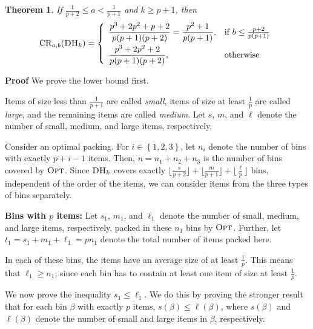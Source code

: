 \documentclass[11pt]{article}
\newtheorem{xtheorem}{Theorem}
\newenvironment{theorem}{\begin{xtheorem}\rm}{\end{xtheorem}}
\newenvironment{proof}{\begin{trivlist}\item[]{\bf Proof }}{\hspace*{\fill}\raisebox{-1pt}{\boldmath$\Box$}\end{trivlist}}
\newcommand{\OPT}{\ensuremath{\operatorname{\textsc{Opt}}}\xspace}
\newcommand{\DHk}{{\ensuremath{\textsc{DH}_k}}\xspace}
\newcommand{\SET}[1]{\left\{#1\right\}}
\newcommand{\CRab}[1]{\ensuremath{\mathrm{CR}_{a,b}(#1)}\xspace}
\newcommand{\p}{p}
\newcommand{\bin}{\ensuremath{\beta}}
\begin{document}
\begin{theorem}\label{lemma-Har-3int}
If $\frac{1}{\p+2}\leq a < \frac{1}{\p+1}$ and $k \geq \p+1$, then
\[
\CRab{\DHk} = 
\left\{
\begin{array}{ll}
\displaystyle 
\frac{\p^3+2\p^2+\p+2}{\p(\p+1)(\p+2)} = \frac{\p^2+1}{\p(\p+1)}, &
               \displaystyle \mbox{if $b \leq \frac{\p+2}{\p(\p+1)}$} \\[2ex]
\displaystyle 
\frac{\p^3+2\p^2+2}{\p(\p+1)(\p+2)},    &
               \displaystyle \mbox{otherwise}
\end{array}
\right.
\]
\end{theorem}
\begin{proof}
 We prove the lower bound first.

Items of size less than $\frac{1}{\p+1}$ are called {\em
  small}, items of size 
at least $\frac{1}{\p}$ are called {\em large}, and the remaining items
are called {\em medium}.
Let $s$, $m$, and $\ell$ denote the number of small, medium, and large
 items, respectively.

Consider an optimal packing.
For $i\in\SET{1,2,3}$,
let $n_i$ denote the number of bins with exactly $\p+i-1$ items.
Then,
$n = n_1 + n_2 + n_3$ is the number of bins covered by \OPT.
Since \DHk covers exactly $\lfloor \frac{s}{\p+2} \rfloor + \lfloor
\frac{m}{\p+1} \rfloor + \lfloor \frac{\ell}{\p} \rfloor$ bins,
independent of the order of the items,  we can
consider items from the three types of bins separately.

{\bf Bins with $\p$ items:}
Let $s_1$, $m_1$, and $\ell_1$ denote the number of small, medium, and
 large items, respectively, packed in these $n_1$ bins by \OPT.
Further, let $t_1 = s_1 + m_1 + \ell_1 = \p n_1$ denote the total
 number of items packed here.

In each of these bins, the items have an average size of at least
$\frac{1}{\p}$. This means that $\ell_1 \geq n_1$, since each bin has to contain at least one item of size at least $\frac{1}{\p}$. 


We now prove the inequality $s_1 \leq \ell_1$.
We do this by proving the stronger result that for each bin $\bin$ with
exactly $\p$ items, $s(\bin) \leq \ell(\bin)$, where $s(\bin)$ and $\ell(\bin)$
denote the number of small and large items in $\bin$, respectively.


\end{proof}
\end{document}
